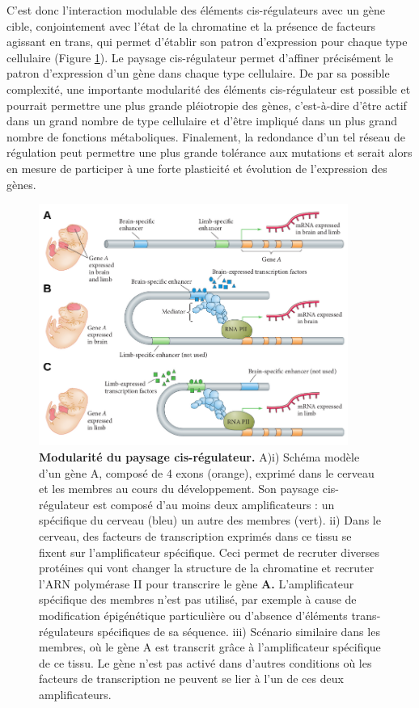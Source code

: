 C’est donc l’interaction modulable des éléments \gls{cis}-régulateurs avec un gène cible, conjointement avec l’état de la chromatine et la présence de facteurs agissant en trans, qui permet d’établir son patron d’expression pour chaque type cellulaire (Figure \ref{fig:Fig23}). Le paysage \gls{cis}-régulateur permet d’affiner précisément le patron d’expression d’un gène dans chaque type cellulaire. De par sa possible complexité, une importante modularité des éléments \gls{cis}-régulateur est possible et pourrait permettre une plus grande pléiotropie des gènes, c’est-à-dire d’être actif dans un grand nombre de type cellulaire et d’être impliqué dans un plus grand nombre de fonctions métaboliques. Finalement, la redondance d’un tel réseau de régulation peut permettre une plus grande tolérance aux mutations et serait alors en mesure de participer à une forte plasticité et évolution de l’expression des gènes.\\

\begin{figure}[h]
    \centering
    \includegraphics[width=0.9\textwidth, page=1] {figures/introduction/fig23.png}
    \caption[Modularité du paysage \gls{cis}-régulateur.]{
    \textbf{Modularité du paysage \gls{cis}-régulateur.}
    A)i) Schéma modèle d'un gène A, composé de 4 exons (orange), exprimé dans le cerveau et les membres au cours du développement. Son paysage \gls{cis}-régulateur est composé d'au moins deux \glspl{amplificateur} : un spécifique du cerveau (bleu) un autre des membres (vert). ii) Dans le cerveau, des facteurs de transcription exprimés dans ce tissu se fixent sur l'\gls{amplificateur} spécifique. Ceci permet de recruter diverses protéines qui vont changer la structure de la chromatine et recruter l'\acrshort{ARN} polymérase II pour transcrire le gène \textbf{A.} L'\gls{amplificateur} spécifique des membres n'est pas utilisé, par exemple à cause de modification épigénétique particulière ou d'absence d'éléments \gls{trans}-régulateurs spécifiques de sa séquence. iii) Scénario similaire dans les membres, où le gène A est transcrit grâce à l'\gls{amplificateur} spécifique de ce tissu. Le gène n'est pas activé dans d'autres \glspl{condition} où les facteurs de transcription ne peuvent se lier à l'un de ces deux \glspl{amplificateur}.\\
    }
    \label{fig:Fig23}
\end{figure}

